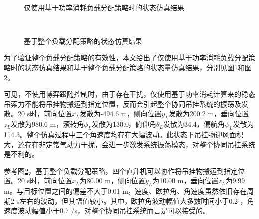 \begin{figure}[!htb]
  \quad
  \\
  \quad
  \caption{仅使用基于功率消耗负载分配策略时的状态仿真结果}
  \label{fig:chap4_5_4_2}
\end{figure}

\begin{figure}[!htb]
  \quad
  \\
  \quad
  \caption{基于整个负载分配策略的状态仿真结果}
  \label{fig:chap4_5_4_3}
\end{figure}

为了验证整个负载分配策略的有效性，本文给出了仅使用基于功率消耗负载分配策略时的状态仿真结果和基于整个负载分配策略的状态量仿真结果，分别见图\ref{fig:chap4_5_4_2}和图\ref{fig:chap4_5_4_3}。

可见，不使用博弈跟随控制时，由于存在干扰，仅使用基于功率消耗计算来的稳态吊索力不能将吊挂物搬运到指定位置，反而会引起整个协同吊挂系统的振荡及发散。20 s时，前向位置$x_L$发散为-494.6 m，侧向位置$y_L$发散为200.2 m，垂向位置$z_L$发散为980.6 m，滚转角$\phi_L$发散为130.0\degree，俯仰角$\theta_L$发散为34.4\degree，偏航角$\psi_L$发散为114.3\degree。整个仿真过程中三个角速度均存在大幅波动。此状态下吊挂物迎风面积大，还存在非定常气动力干扰，会进一步激发系统振荡模态，对整个协同吊挂系统是不利的。

参考图\ref{fig:chap4_5_4_3}，基于整个负载分配策略，四个直升机可以协作将吊挂物搬运到指定位置。20 s时，前向位置$x_L$为80.00 m，侧向位置$y_L$为10.00 m，垂向位置$z_L$为9.99 m。与目标位置之间的偏差不大于0.01 m。速度、欧拉角、角速度虽然依旧存在周期2 s左右的波动，但其幅值较小。其中，欧拉角波动幅值大多数时间小于0.2 \degree，角速度波动幅值小于0.7 \degree/s，对整个协同吊挂系统而言是可以接受的。

